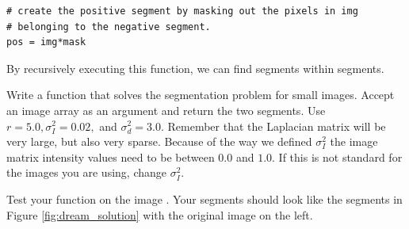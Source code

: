 \begin{lstlisting}
# create the positive segment by masking out the pixels in img 
# belonging to the negative segment.
pos = img*mask
\end{lstlisting}
By recursively executing this function, we can find segments within segments.


\begin{problem}  Write a function  that solves the segmentation problem for small images.
Accept an image array as an argument and return the two segments.
Use $r = 5.0, \sigma_I^2 = 0.02,$ and $\sigma_d^2 = 3.0$.
Remember that the Laplacian matrix will be very large, but also very sparse.
Because of the way we defined $\sigma_I^2$ the image matrix intensity values need to be between $0.0$ and $1.0$. If this is not standard for the images you are using, change $\sigma_I^2$.

Test your function on the image . Your segments should look like the segments in Figure \ref{fig:dream_solution} with the original image on the left.
\end{problem}

